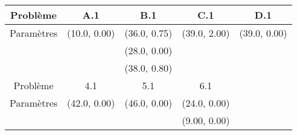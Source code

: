 \begin{tabular}{*{5}{c}}
	\toprule
	Problème   & A.1          & B.1          & C.1          & D.1 \\
	\midrule
	Paramètres & (10.0, 0.00) & (36.0, 0.75) & (39.0, 2.00) & (39.0, 0.00) \\
	           &              & (28.0, 0.00) &              & \\
	           &              & (38.0, 0.80) &              & \\
	\bottomrule
	\toprule
	Problème   & 4.1          & 5.1          & 6.1          & \\
	\midrule
	Paramètres & (42.0, 0.00) & (46.0, 0.00) & (24.0, 0.00) & \\
	           &              &              & (9.00, 0.00) & \\
	\bottomrule
\end{tabular}

